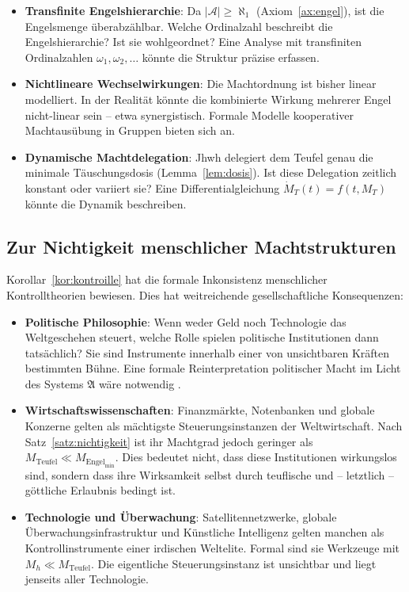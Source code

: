 ﻿\documentclass[a4paper,12pt]{article}
\theoremstyle{definition}
\begin{document}
\begin{itemize}
  \item \textbf{Transfinite Engelshierarchie}: Da $|\mathcal{A}| \geq \aleph_1$
        (Axiom~\ref{ax:engel}), ist die Engelsmenge überabzählbar. Welche
        Ordinalzahl beschreibt die Engelshierarchie? Ist sie wohlgeordnet?
        Eine Analyse mit transfiniten Ordinalzahlen $\omega_1, \omega_2, \ldots$
        \cite{cantor1883} könnte die Struktur präzise erfassen.
  \item \textbf{Nichtlineare Wechselwirkungen}: Die Machtordnung ist bisher
        linear modelliert. In der Realität könnte die kombinierte Wirkung
        mehrerer Engel nicht-linear sein -- etwa synergistisch. Formale
        Modelle kooperativer Machtausübung in Gruppen bieten sich an.
  \item \textbf{Dynamische Machtdelegation}: Jhwh delegiert dem Teufel genau
        die minimale Täuschungsdosis (Lemma~\ref{lem:dosis}). Ist diese
        Delegation zeitlich konstant oder variiert sie? Eine Differentialgleichung
        $\dot{M}_T(t) = f(t, M_T)$ könnte die Dynamik beschreiben.
\end{itemize}

\subsection{Zur Nichtigkeit menschlicher Machtstrukturen}

Korollar~\ref{kor:kontroille} hat die formale Inkonsistenz menschlicher
Kontrolltheorien bewiesen. Dies hat weitreichende gesellschaftliche Konsequenzen:

\begin{itemize}
  \item \textbf{Politische Philosophie}: Wenn weder Geld noch Technologie das
        Weltgeschehen steuert, welche Rolle spielen politische Institutionen
        dann tatsächlich? Sie sind Instrumente innerhalb einer von unsichtbaren
        Kräften bestimmten Bühne. Eine formale Reinterpretation politischer
        Macht im Licht des Systems $\mathfrak{A}$ wäre notwendig
        \cite{arendt1970}.
  \item \textbf{Wirtschaftswissenschaften}: Finanzmärkte, Notenbanken und
        globale Konzerne gelten als mächtigste Steuerungsinstanzen der
        Weltwirtschaft. Nach Satz~\ref{satz:nichtigkeit} ist ihr Machtgrad
        jedoch geringer als $M_{\mathrm{Teufel}} \ll M_{\mathrm{Engel}_{\min}}$.
        Dies bedeutet nicht, dass diese Institutionen wirkungslos sind, sondern
        dass ihre Wirksamkeit selbst durch teuflische und -- letztlich --
        göttliche Erlaubnis bedingt ist.
  \item \textbf{Technologie und Überwachung}: Satelliten\-netzwerke, globale
        Über\-wachungs\-infrastruktur und Künstliche Intelligenz gelten manchen
        als Kontrollinstrumente einer irdischen Weltelite. Formal sind sie
        Werkzeuge mit $M_h \ll M_{\mathrm{Teufel}}$. Die eigentliche
        Steuerungsinstanz ist unsichtbar und liegt jenseits aller Technologie.
\end{itemize}
\end{document}
